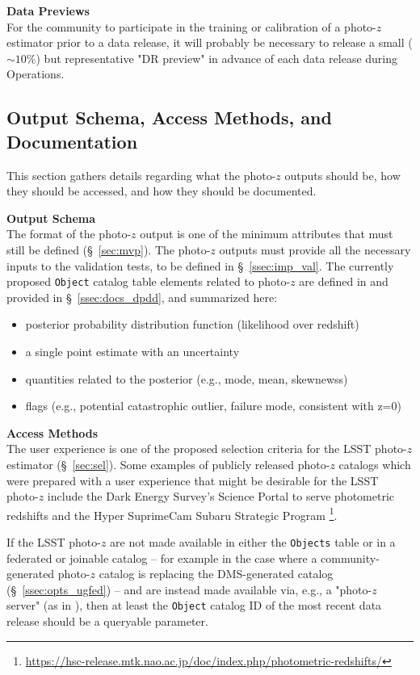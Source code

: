 \documentclass[DM,lsstdraft,toc]{lsstdoc}
\begin{document}
{\bf Data Previews}\\
For the community to participate in the training or calibration of a photo-$z$ estimator prior to a data release, it will probably be necessary to release a small ($\sim10\%$) but representative "DR preview" in advance of each data release during Operations.


\subsection{Output Schema, Access Methods, and Documentation}\label{ssec:dp_pz}

This section gathers details regarding what the photo-$z$ outputs should be, how they should be accessed, and how they should be documented.

{\bf Output Schema}\\
The format of the photo-$z$ output is one of the minimum attributes that must still be defined (\S~\ref{sec:mvp}). 
The photo-$z$ outputs must provide all the necessary inputs to the validation tests, to be defined in \S~\ref{ssec:imp_val}.
The currently proposed {\tt Object} catalog table elements related to photo-$z$ are defined in  and provided in \S~\ref{ssec:docs_dpdd}, and summarized here:
\vspace{-15pt}
\begin{itemize}
\item posterior probability distribution function (likelihood over redshift)
\item a single point estimate with an uncertainty
\item quantities related to the posterior (e.g., mode, mean, skewnewss)
\item flags (e.g., potential catastrophic outlier, failure mode, consistent with z=0)
\end{itemize}

{\bf Access Methods}\\
The user experience is one of the proposed selection criteria for the LSST photo-$z$ estimator (\S~\ref{sec:sel}). 
Some examples of publicly released photo-$z$ catalogs which were prepared with a user experience that might be desirable for the LSST photo-$z$ include the Dark Energy Survey's Science Portal to serve photometric redshifts \cite{2018A&C....25...58G} and the Hyper SuprimeCam Subaru Strategic Program \cite{2018PASJ...70S...9T}\footnote{\url{https://hsc-release.mtk.nao.ac.jp/doc/index.php/photometric-redshifts/}}.

If the LSST photo-$z$ are not made available in either the {\tt Objects} table or in a federated or joinable catalog -- for example in the case where a community-generated photo-$z$ catalog is replacing the DMS-generated catalog (\S~\ref{ssec:opts_ugfed}) -- and are instead made available via, e.g., a "photo-$z$ server" (as in \cite{2018A&C....25...58G}), then at least the {\tt Object} catalog ID of the most recent data release should be a queryable parameter.
\end{document}

